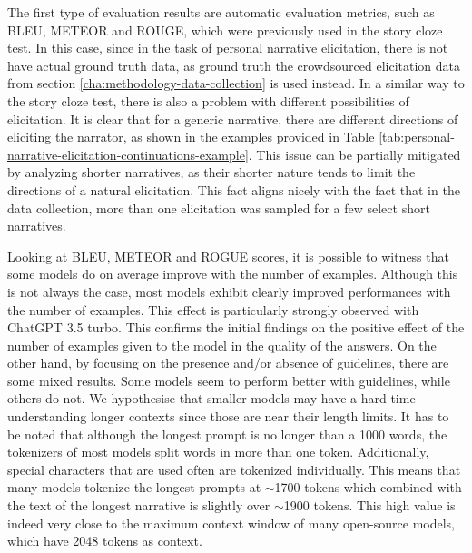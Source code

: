 % 
The first type of evaluation results are automatic evaluation metrics, such as BLEU, METEOR and ROUGE, which were previously used in the story cloze test. In this case, since in the task of personal narrative elicitation, there is not have actual ground truth data, as ground truth the crowdsourced elicitation data from section \ref{cha:methodology-data-collection} is used instead. In a similar way to the story cloze test, there is also a problem with different possibilities of elicitation. It is clear that for a generic narrative, there are different directions of eliciting the narrator, as shown in the examples provided in Table \ref{tab:personal-narrative-elicitation-continuations-example}. This issue can be partially mitigated by analyzing shorter narratives, as their shorter nature tends to limit the directions of a natural elicitation. This fact aligns nicely with the fact that in the data collection, more than one elicitation was sampled for a few select short narratives. 





Looking at BLEU, METEOR and ROGUE scores, it is possible to witness that some models do on average improve with the number of examples. Although this is not always the case, most models exhibit clearly improved performances with the number of examples. This effect is particularly strongly observed with ChatGPT 3.5 turbo. This confirms the initial findings on the positive effect of the number of examples given to the model in the quality of the answers.
On the other hand, by focusing on the presence and/or absence of guidelines, there are some mixed results. Some models seem to perform better with guidelines, while others do not. We hypothesise that smaller models may have a hard time understanding longer contexts since those are near their length limits. It has to be noted that although the longest prompt is no longer than a 1000 words, the tokenizers of most models split words in more than one token. Additionally, special characters that are used often are tokenized individually. This means that many models tokenize the longest prompts at $\sim$1700 tokens which combined with the text of the longest narrative is slightly over $\sim$1900 tokens. This high value is indeed very close to the maximum context window of many open-source models, which have 2048 tokens as context.

